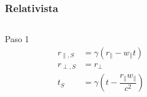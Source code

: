 \documentclass{beamer}
\begin{document}
\begin{frame}[t]
    \frametitle[prueb1]{Relativista}
    \begin{columns}
        \begin{column}{0.5\textwidth}
            \begin{block}{Paso 1}
                \begin{align*}
                    r_{\parallel,S} &= \gamma\left( r_\parallel - w_\parallel t \right) \nonumber\\
                    r_{\perp, S} &= r_\perp  \\
                    t_S &= \gamma\left( t - \dfrac{r_\parallel w_\parallel}{c^2} \right) \nonumber
                \end{align*}
                \vspace{5.5mm}
            \end{block}
        \end{column}
        \begin{column}{0.5\textwidth}
        \end{column}
    \end{columns}
\end{frame}
\end{document}
